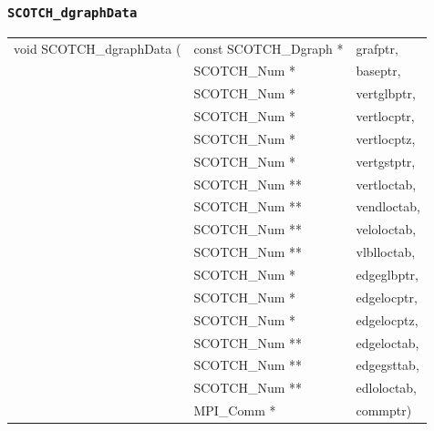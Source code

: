 \subsubsection{{\tt SCOTCH\_dgraphData}}
\label{sec-lib-func-dgraphdata}

\begin{itemize}
\progsyn

{\tt\begin{tabular}{l@{}ll}
void SCOTCH\_dgraphData ( & const SCOTCH\_Dgraph * & grafptr,    \\
                          & SCOTCH\_Num *          & baseptr,    \\
                          & SCOTCH\_Num *          & vertglbptr, \\
                          & SCOTCH\_Num *          & vertlocptr, \\
                          & SCOTCH\_Num *          & vertlocptz, \\
                          & SCOTCH\_Num *          & vertgstptr, \\
                          & SCOTCH\_Num **         & vertloctab, \\
                          & SCOTCH\_Num **         & vendloctab, \\
                          & SCOTCH\_Num **         & veloloctab, \\
                          & SCOTCH\_Num **         & vlblloctab, \\
                          & SCOTCH\_Num *          & edgeglbptr, \\
                          & SCOTCH\_Num *          & edgelocptr, \\
                          & SCOTCH\_Num *          & edgelocptz, \\
                          & SCOTCH\_Num **         & edgeloctab, \\
                          & SCOTCH\_Num **         & edgegsttab, \\
                          & SCOTCH\_Num **         & edloloctab, \\
                          & MPI\_Comm *            & commptr)
\end{tabular}}


\end{itemize}
